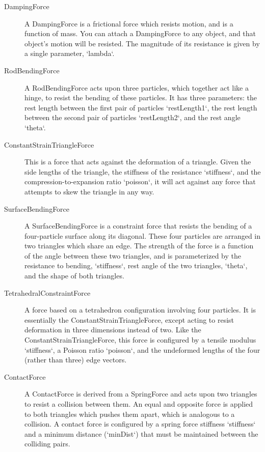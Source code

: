 \begin{description}
\item[DampingForce] A DampingForce is a frictional force which resists
  motion, and is a function of mass. You can attach a DampingForce to
  any object, and that object's motion will be resisted. The magnitude
  of its resistance is given by a single parameter, `lambda`.

\item[RodBendingForce] A RodBendingForce acts upon three particles, which
  together act like a hinge, to resist the bending of these
  particles. It has three parameters: the rest length between the
  first pair of particles `restLength1`, the rest length between the
  second pair of particles `restLength2`, and the rest angle `theta`.

\item[ConstantStrainTriangleForce] This is a force that acts against the
  deformation of a triangle. Given the side lengths of the triangle,
  the stiffness of the resistance `stiffness`, and the
  compression-to-expansion ratio `poisson`, it will act against any
  force that attempts to skew the triangle in any way.

\item[SurfaceBendingForce] A SurfaceBendingForce is a constraint force that
  resists the bending of a four-particle surface along its diagonal.
  These four particles are arranged in two triangles which share an
  edge. The strength of the force is a function of the angle between
  these two triangles, and is parameterized by the resistance to
  bending, `stiffness`, rest angle of the two triangles, `theta`, and
  the shape of both triangles.

\item[TetrahedralConstraintForce] A force based on a tetrahedron
  configuration involving four particles. It is essentially the
  ConstantStrainTriangleForce, except acting to resist deformation in
  three dimensions instead of two. Like the
  ConstantStrainTriangleForce, this force is configured by a tensile
  modulus `stiffness`, a Poisson ratio `poisson`, and the undeformed
  lengths of the four (rather than three) edge vectors.

\item[ContactForce] A ContactForce is derived from a SpringForce and acts
  upon two triangles to resist a collision between them. An equal and
  opposite force is applied to both triangles which pushes them apart,
  which is analogous to a collision. A contact force is configured by
  a spring force stiffness `stiffness` and a minimum distance
  (`minDist`) that must be maintained between the colliding pairs.
\end{description}

